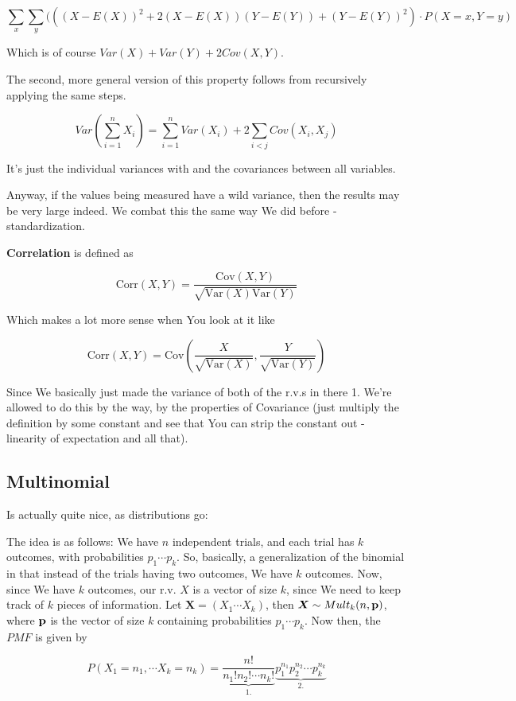 \documentclass{article}
\begin{document}
		 \[\sum_x \sum_y  (((X-E(X))^2+2(X-E(X))(Y-E(Y)) + (Y-E(Y))^2) \cdot P(X=x, Y=y) \]
		 
		 Which is of course $Var(X) + Var(Y) + 2Cov(X, Y)$. 
		 
		 The second, more general version of this property follows from recursively applying the same steps.
		 	 
		\[ Var\left( \sum^n_{i=1} X_i \right) =  \sum^n_{i=1} Var(X_i) + 2\sum_{i<j} Cov(X_i, X_j) \]
		
		It's just the individual variances with and the covariances between all variables.
		 		
		Anyway, if the values being measured have a wild variance, then the results may be very large indeed. We combat this the same way We did before - standardization. 
		
		\textbf{Correlation} is defined as
		
		\[ \text{Corr}(X, Y) = \frac{\text{Cov}(X, Y)}{\sqrt{\text{Var}(X)\text{Var}(Y)}} \]
		
		Which makes a lot more sense when You look at it like
		
		\[ \text{Corr}(X, Y) = \text{Cov}\left(\frac{X}{\sqrt{\text{Var}(X)}}, \frac{Y}{\sqrt{\text{Var}(Y)}}\right) \]
		
		Since We basically just made the variance of both of the r.v.s in there 1. We're allowed to do this by the way, by the properties of Covariance (just multiply the definition by some constant and see that You can strip the constant out - linearity of expectation and all that).
		
	\subsection{Multinomial}
	
		Is actually quite nice, as distributions go:
		
		The idea is as follows: We have $n$ independent trials, and each trial has $k$ outcomes, with probabilities $p_1\cdots p_k$. So, basically, a generalization of the binomial in that instead of the trials having two outcomes, We have $k$ outcomes. Now, since We have $k$ outcomes, our r.v. $X$ is a vector of size $k$, since We need to keep track of $k$ pieces of information. Let $\bm{X} = (X_1\cdots X_k)$, then $\bm{X}\sim Mult_k(n, \bf{p})$, where $\bf{p}$ is the vector of size $k$ containing probabilities $p_1\cdots p_k$. Now then, the $PMF$ is given by
		
		\[ P(X_1 = n_1,\cdots X_k = n_k) = \underbrace{\frac{n!}{n_1!n_2!\cdots n_k!}}_{1.} \underbrace{p_1^{n_1}p_2^{n_2}\cdots p_k^{n_k}}_{2.} \]
		
\end{document}
